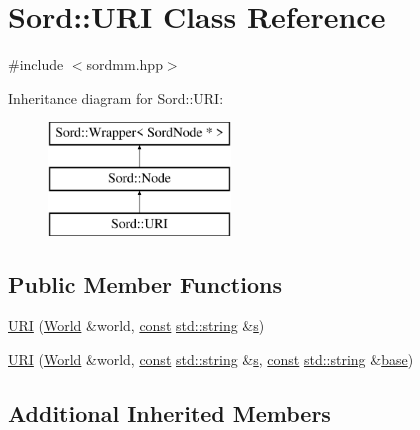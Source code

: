 \hypertarget{class_sord_1_1_u_r_i}{}\section{Sord\+:\+:U\+RI Class Reference}
\label{class_sord_1_1_u_r_i}


{\ttfamily \#include $<$sordmm.\+hpp$>$}

Inheritance diagram for Sord\+:\+:U\+RI\+:\begin{figure}[H]
\begin{center}
\leavevmode
\includegraphics[height=3.000000cm]{class_sord_1_1_u_r_i}
\end{center}
\end{figure}
\subsection*{Public Member Functions}
\begin{DoxyCompactItemize}
\item 
\hyperlink{class_sord_1_1_u_r_i_ab686653d2f7f4f28a9cdb30c2e725f48}{U\+RI} (\hyperlink{class_sord_1_1_world}{World} \&world, \hyperlink{getopt1_8c_a2c212835823e3c54a8ab6d95c652660e}{const} \hyperlink{test__lib_f_l_a_c_2format_8c_ab02026ad0de9fb6c1b4233deb0a00c75}{std\+::string} \&\hyperlink{lib_2expat_8h_a755339d27872b13735c2cab829e47157}{s})
\item 
\hyperlink{class_sord_1_1_u_r_i_a54cb44005d4f8b24cd8ace5b4dce8945}{U\+RI} (\hyperlink{class_sord_1_1_world}{World} \&world, \hyperlink{getopt1_8c_a2c212835823e3c54a8ab6d95c652660e}{const} \hyperlink{test__lib_f_l_a_c_2format_8c_ab02026ad0de9fb6c1b4233deb0a00c75}{std\+::string} \&\hyperlink{lib_2expat_8h_a755339d27872b13735c2cab829e47157}{s}, \hyperlink{getopt1_8c_a2c212835823e3c54a8ab6d95c652660e}{const} \hyperlink{test__lib_f_l_a_c_2format_8c_ab02026ad0de9fb6c1b4233deb0a00c75}{std\+::string} \&\hyperlink{lib_2expat_8h_a938e186c531ea86ae9adf3c0a649d8fc}{base})
\end{DoxyCompactItemize}
\subsection*{Additional Inherited Members}


